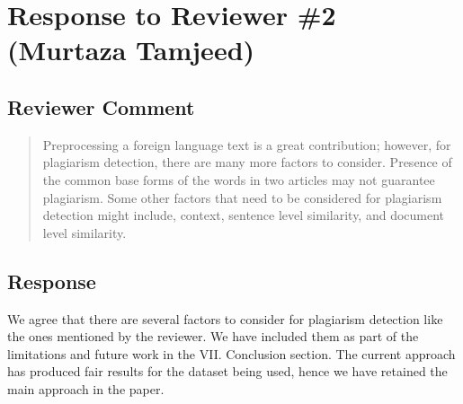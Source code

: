 \section{Response to Reviewer \#2 (Murtaza Tamjeed)}



\subsection{Reviewer Comment}
\begin{mdframed}
\begin{quote}
	Preprocessing a
foreign language text is a great contribution; however, for plagiarism detection,
there are many more factors to consider. Presence of the common base forms of
the words in two articles may not guarantee plagiarism. Some other factors that
need to be considered for plagiarism detection might include, context, sentence
level similarity, and document level similarity.
\end{quote}
\end{mdframed}

\subsection{Response} 
We agree that there are several factors to consider for plagiarism detection
like the ones mentioned by the reviewer. We have included them as part of the
limitations and future work in the VII. Conclusion section. The current approach
has produced fair results for the dataset being used, hence we have retained the
main approach in the paper.\\


